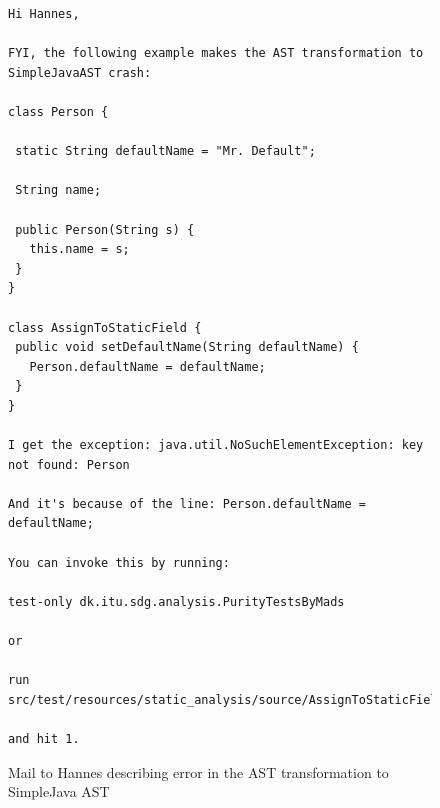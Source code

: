 \documentclass[11pt]{exam}
\begin{document}
\begin{figure}[b]
\begin{lstlisting}
Hi Hannes,

FYI, the following example makes the AST transformation to SimpleJavaAST crash:

class Person {

 static String defaultName = "Mr. Default";

 String name;

 public Person(String s) {
   this.name = s;
 }
}

class AssignToStaticField {
 public void setDefaultName(String defaultName) {
   Person.defaultName = defaultName;
 }
}

I get the exception: java.util.NoSuchElementException: key not found: Person

And it's because of the line: Person.defaultName = defaultName;

You can invoke this by running:

test-only dk.itu.sdg.analysis.PurityTestsByMads

or

run src/test/resources/static_analysis/source/AssignToStaticField.java

and hit 1.
\end{lstlisting}
  \caption{Mail to Hannes describing error in the AST transformation to SimpleJava AST}
  \label{mail_to_hannes}
\end{figure}
\end{document}
